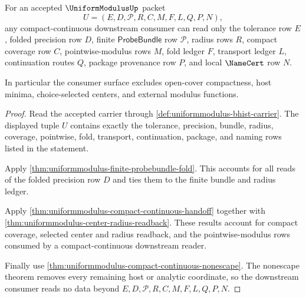 \begin{theorem}
\label{thm:uniformmodulus-consumer-read-exhaustion}
For an accepted $\UniformModulusUp$ packet
$$
U=(E,D,\mathcal{P},R,C,M,F,L,Q,P,N),
$$
any compact-continuous downstream consumer can read only the tolerance row $E$, folded precision row $D$, finite $\mathsf{ProbeBundle}$ row $\mathcal{P}$, radius rows $R$, compact coverage row $C$, pointwise-modulus rows $M$, fold ledger $F$, transport ledger $L$, continuation routes $Q$, package provenance row $P$, and local $\NameCert$ row $N$.

In particular the consumer surface excludes open-cover compactness, host minima, choice-selected centers, and external modulus functions.
\end{theorem}
\begin{proof}
Read the accepted carrier through \autoref{def:uniformmodulus-bhist-carrier}. The displayed tuple $U$ contains exactly the tolerance, precision, bundle, radius, coverage, pointwise, fold, transport, continuation, package, and naming rows listed in the statement.

Apply \autoref{thm:uniformmodulus-finite-probebundle-fold}. This accounts for all reads of the folded precision row $D$ and ties them to the finite bundle and radius ledger.

Apply \autoref{thm:uniformmodulus-compact-continuous-handoff} together with \autoref{thm:uniformmodulus-center-radius-readback}. These results account for compact coverage, selected center and radius readback, and the pointwise-modulus rows consumed by a compact-continuous downstream reader.

Finally use \autoref{thm:uniformmodulus-compact-continuous-nonescape}. The nonescape theorem removes every remaining host or analytic coordinate, so the downstream consumer reads no data beyond $E,D,\mathcal{P},R,C,M,F,L,Q,P,N$.
\end{proof}

